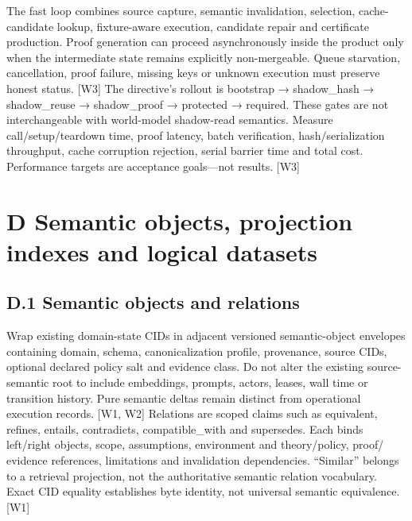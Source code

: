 \documentclass{article}
\begin{document}
The fast loop combines source capture, semantic invalidation, selection, cache-candidate lookup,
fixture-aware execution, candidate repair and certificate production. Proof generation can proceed
asynchronously inside the product only when the intermediate state remains explicitly non-mergeable.
Queue starvation, cancellation, proof failure, missing keys or unknown execution must preserve
honest status. [W3]
The directive’s rollout is bootstrap → shadow\_hash → shadow\_reuse → shadow\_proof → protected
→ required. These gates are not interchangeable with world-model shadow-read semantics. Measure
call/setup/teardown time, proof latency, batch verification, hash/serialization throughput, cache
corruption rejection, serial barrier time and total cost. Performance targets are acceptance goals—not
results. [W3]


\section*{D Semantic objects, projection indexes and logical datasets}
\subsection*{D.1 Semantic objects and relations}

Wrap existing domain-state CIDs in adjacent versioned semantic-object envelopes containing domain,
schema, canonicalization profile, provenance, source CIDs, optional declared policy salt and evidence
class. Do not alter the existing source-semantic root to include embeddings, prompts, actors, leases,
wall time or transition history. Pure semantic deltas remain distinct from operational execution
records. [W1, W2]
Relations are scoped claims such as equivalent, refines, entails, contradicts, compatible\_with and
supersedes. Each binds left/right objects, scope, assumptions, environment and theory/policy, proof/
evidence references, limitations and invalidation dependencies. “Similar” belongs to a retrieval
projection, not the authoritative semantic relation vocabulary. Exact CID equality establishes byte
identity, not universal semantic equivalence. [W1]
\end{document}
